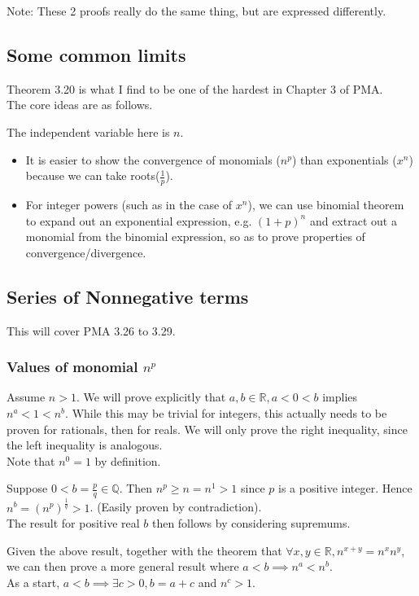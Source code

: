 \documentclass{article}
\begin{document}
Note: These 2 proofs really do the same thing, but are expressed differently.


\subsection{Some common limits}
Theorem 3.20 is what I find to be one of the hardest in Chapter 3 of PMA.\\
The core ideas are as follows.

The independent variable here is $n$.
\begin{itemize}
	\item It is easier to show the convergence of monomials ($n^p$) than exponentials ($x^n$) because we can take roots($\frac{1}{p}$).
	\item For integer powers (such as in the case of $x^n$), we can use binomial theorem to expand out an exponential expression, e.g. $(1+p)^n$ and extract out a monomial from the binomial expression, so as to prove properties of convergence/divergence.
\end{itemize}

\subsection{Series of Nonnegative terms}
This will cover PMA 3.26 to 3.29.

\subsubsection{Values of monomial $n^p$}
Assume $n > 1$.
We will prove explicitly that $a,b\in \mathbb{R}, a < 0 < b$ implies $n^a < 1 < n^b$. While this may be trivial for integers, this actually needs to be proven for rationals, then for reals. We will only prove the right inequality, since the left inequality is analogous.\\
Note that $n^0=1$ by definition.

Suppose $0 < b=\frac{p}{q}\in \mathbb{Q}$. Then $n^p \geq n = n^1 > 1$ since $p$ is a positive integer. Hence $n^b=(n^p)^\frac{1}{q}>1$. (Easily proven by contradiction).\\
The result for positive real $b$ then follows by considering supremums.

Given the above result, together with the theorem that $\forall x,y\in \mathbb{R}, n^{x+y}=n^xn^y$, we can then prove a more general result where $a < b\implies n^a < n^b$.\\
As a start, $a < b\implies \exists c > 0, b = a + c$ and $n^c > 1$.
\end{document}
